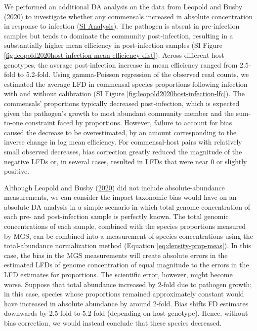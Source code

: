 \documentclass[
]{article}
\begin{document}
We performed an additional DA analysis on the data from Leopold and Busby (\protect\hyperlink{ref-leopold2020host}{2020}) to investigate whether any commensals increased in absolute concentration in response to infection (\href{https://mikemc.github.io/differential-abundance-theory/notebook/posts/2022-01-08-leopold2020host-case-study/\#change-in-commensals-due-to-infection}{SI Analysis}).
The pathogen is absent in pre-infection samples but tends to dominate the community post-infection, resulting in a substantially higher mean efficiency in post-infection samples (SI Figure \ref{fig:leopold2020host-infection-mean-efficiency-dist}).
Across different host genotypes, the average post-infection increase in mean efficiency ranged from 2.5-fold to 5.2-fold.
Using gamma-Poisson regression of the observed read counts, we estimated the average LFD in commensal species proportions following infection with and without calibration (SI Figure \ref{fig:leopold2020host-infection-lfc}).
The commensals' proportions typically decreased post-infection, which is expected given the pathogen's growth to most abundant community member and the sum-to-one constraint faced by proportions.
However, failure to account for bias caused the decrease to be overestimated, by an amount corresponding to the inverse change in log mean efficiency.
For commensal-host pairs with relatively small observed decreases, bias correction greatly reduced the magnitude of the negative LFDs or, in several cases, resulted in LFDs that were near 0 or slightly positive.

Although Leopold and Busby (\protect\hyperlink{ref-leopold2020host}{2020}) did not include absolute-abundance measurements, we can consider the impact taxonomic bias would have on an absolute DA analysis in a simple scenario in which total genome concentration of each pre- and post-infection sample is perfectly known.
The total genomic concentrations of each sample, combined with the species proportions measured by MGS, can be combined into a measurement of species concentrations using the total-abundance normalization method (Equation \eqref{eq:density-prop-meas}).
In this case, the bias in the MGS measurements will create absolute errors in the estimated LFDs of genome concentration of equal magnitude to the errors in the LFD estimates for proportions.
The scientific error, however, might become worse.
Suppose that total abundance increased by 2-fold due to pathogen growth; in this case, species whose proportions remained approximately constant would have increased in absolute abundance by around 2-fold.
Bias shifts FD estimates downwards by 2.5-fold to 5.2-fold (depending on host genotype).
Hence, without bias correction, we would instead conclude that these species decreased.
\end{document}
